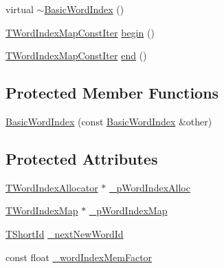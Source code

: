 \begin{DoxyCompactItemize}
\item 
virtual \hyperlink{classuva_1_1smt_1_1tries_1_1dictionary_1_1_basic_word_index_aae2a6fd6f0a6d6d5b76278f628b31ba1}{$\sim$\+Basic\+Word\+Index} ()
\item 
\hyperlink{classuva_1_1smt_1_1tries_1_1dictionary_1_1_basic_word_index_aedf00c11ba1f7ef5565ed7ed523087ec}{T\+Word\+Index\+Map\+Const\+Iter} \hyperlink{classuva_1_1smt_1_1tries_1_1dictionary_1_1_basic_word_index_aa918c020da3d1559f327776a1177404d}{begin} ()
\item 
\hyperlink{classuva_1_1smt_1_1tries_1_1dictionary_1_1_basic_word_index_aedf00c11ba1f7ef5565ed7ed523087ec}{T\+Word\+Index\+Map\+Const\+Iter} \hyperlink{classuva_1_1smt_1_1tries_1_1dictionary_1_1_basic_word_index_aa6fd45516d2be557c6447124880f23c6}{end} ()
\end{DoxyCompactItemize}
\subsection*{Protected Member Functions}
\begin{DoxyCompactItemize}
\item 
\hyperlink{classuva_1_1smt_1_1tries_1_1dictionary_1_1_basic_word_index_a7a4a2a9a405e6073f1c5aec4040327bf}{Basic\+Word\+Index} (const \hyperlink{classuva_1_1smt_1_1tries_1_1dictionary_1_1_basic_word_index}{Basic\+Word\+Index} \&other)
\end{DoxyCompactItemize}
\subsection*{Protected Attributes}
\begin{DoxyCompactItemize}
\item 
\hyperlink{classuva_1_1smt_1_1tries_1_1dictionary_1_1_basic_word_index_a8905f9a7cdaf1c7295043be33de20749}{T\+Word\+Index\+Allocator} $\ast$ \hyperlink{classuva_1_1smt_1_1tries_1_1dictionary_1_1_basic_word_index_a466c8ca9da06fd8c6640f20b77ca5b8a}{\+\_\+p\+Word\+Index\+Alloc}
\item 
\hyperlink{classuva_1_1smt_1_1tries_1_1dictionary_1_1_basic_word_index_ab9afbbd6dda7d8579f804508ac094574}{T\+Word\+Index\+Map} $\ast$ \hyperlink{classuva_1_1smt_1_1tries_1_1dictionary_1_1_basic_word_index_a549d0686e0530922a7261e33a0cdfd20}{\+\_\+p\+Word\+Index\+Map}
\item 
\hyperlink{namespaceuva_1_1smt_1_1hashing_adcf22e1982ad09d3a63494c006267469}{T\+Short\+Id} \hyperlink{classuva_1_1smt_1_1tries_1_1dictionary_1_1_basic_word_index_a416378bae82da48aea2aa2b83f54731b}{\+\_\+next\+New\+Word\+Id}
\item 
const float \hyperlink{classuva_1_1smt_1_1tries_1_1dictionary_1_1_basic_word_index_a4efb17e8e41fbd432db6e0472df193ad}{\+\_\+word\+Index\+Mem\+Factor}
\end{DoxyCompactItemize}
